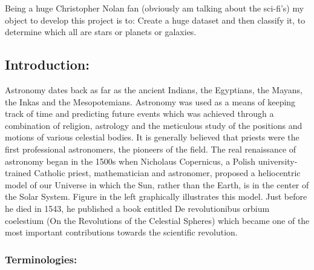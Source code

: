 \documentclass[11pt]{article}
\begin{document}
Being a huge Christopher Nolan fan (obviously am talking about the
sci-fi's) my object to develop this project is to: Create a huge dataset
and then classify it, to determine which all are stars or planets or
galaxies.

    \subsection{ Introduction:}\label{introduction}

Astronomy dates back as far as the ancient Indians, the Egyptians, the
Mayans, the Inkas and the Mesopotemians. Astronomy was used as a means
of keeping track of time and predicting future events which was achieved
through a combination of religion, astrology and the meticulous study of
the positions and motions of various celestial bodies. It is generally
believed that priests were the first professional astronomers, the
pioneers of the field. The real renaissance of astronomy began in the
1500s when Nicholaus Copernicus, a Polish university-trained Catholic
priest, mathematician and astronomer, proposed a heliocentric model of
our Universe in which the Sun, rather than the Earth, is in the center
of the Solar System. Figure in the left graphically illustrates this
model. Just before he died in 1543, he published a book entitled De
revolutionibus orbium coelestium (On the Revolutions of the Celestial
Spheres) which became one of the most important contributions towards
the scientific revolution.

\subsubsection{Terminologies:}\label{terminologies}
\end{document}
